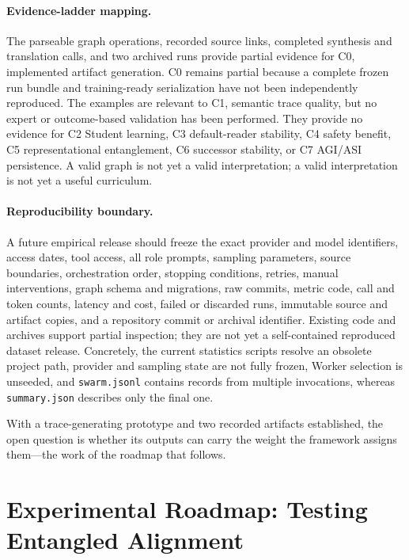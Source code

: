 \paragraph{Evidence-ladder mapping.} The parseable graph operations, recorded
source links, completed synthesis and translation calls, and two archived runs
provide partial evidence for C0, implemented artifact generation. C0 remains
partial because a complete frozen run bundle and training-ready serialization
have not been independently reproduced. The examples are relevant to C1,
semantic trace quality, but no expert or outcome-based validation has been
performed. They provide no evidence for C2 Student learning, C3 default-reader
stability, C4 safety benefit, C5 representational entanglement, C6 successor
stability, or C7 AGI/ASI persistence. A valid graph is not yet a valid
interpretation; a valid interpretation is not yet a useful curriculum.

\paragraph{Reproducibility boundary.} A future empirical release should freeze
the exact provider and model identifiers, access dates, tool access, all role
prompts, sampling parameters, source boundaries, orchestration order, stopping
conditions, retries, manual interventions, graph schema and migrations, raw
commits, metric code, call and token counts, latency and cost, failed or
discarded runs, immutable source and artifact copies, and a repository commit
or archival identifier. Existing code and archives support partial inspection;
they are not yet a self-contained reproduced dataset release. Concretely, the
current statistics scripts resolve an obsolete project path, provider and
sampling state are not fully frozen, Worker selection is unseeded, and
\texttt{swarm.jsonl} contains records from multiple invocations, whereas \texttt{summary.json} describes only the final one.


With a trace-generating prototype and two recorded artifacts established, the
open question is whether its outputs can carry the weight the framework assigns
them---the work of the roadmap that follows.

\section{Experimental Roadmap: Testing Entangled Alignment}
\label{sec:experimental-roadmap}
\label{sec:experiments}

